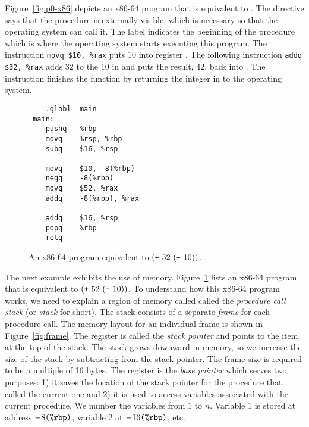 \documentclass[11pt]{book}
\begin{document}
Figure~\ref{fig:p0-x86} depicts an x86-64 program that is equivalent
to . The  directive says that the
 procedure is externally visible, which is necessary so
that the operating system can call it. The label 
indicates the beginning of the  procedure which is where
the operating system starts executing this program.  The instruction
\lstinline{movq $10, %rax} puts $10$ into register . The
following instruction \lstinline{addq $32, %rax} adds $32$ to the
$10$ in  and puts the result, $42$, back into
. The instruction  finishes the 
function by returning the integer in  to the
operating system.


\begin{wrapfigure}{r}{2.25in}
\begin{lstlisting}
	.globl _main
_main:
	pushq	%rbp
	movq	%rsp, %rbp
	subq	$16, %rsp

	movq	$10, -8(%rbp)
	negq	-8(%rbp)
	movq	$52, %rax
	addq	-8(%rbp), %rax

	addq	$16, %rsp
	popq	%rbp
	retq
\end{lstlisting}
\caption{An x86-64 program equivalent to $(\texttt{+}~52~(\texttt{-}~10) )$.}
\label{fig:p1-x86}
\end{wrapfigure}

The next example exhibits the use of memory.  Figure~\ref{fig:p1-x86}
lists an x86-64 program that is equivalent to $(\texttt{+}~52~
  (\texttt{-}~10) )$. To understand how this x86-64 program works, we
need to explain a region of memory called called the \emph{procedure
  call stack} (or \emph{stack} for short). The stack consists of a
separate \emph{frame} for each procedure call. The memory layout for
an individual frame is shown in Figure~\ref{fig:frame}.  The register
 is called the \emph{stack pointer} and points to the item at
the top of the stack. The stack grows downward in memory, so we
increase the size of the stack by subtracting from the stack
pointer. The frame size is required to be a multiple of 16 bytes. The
register  is the \emph{base pointer} which serves two
purposes: 1) it saves the location of the stack pointer for the
procedure that called the current one and 2) it is used to access
variables associated with the current procedure. We number the
variables from $1$ to $n$. Variable $1$ is stored at address
$-8\texttt{(\%rbp)}$, variable $2$ at $-16\texttt{(\%rbp)}$, etc.
\end{document}
